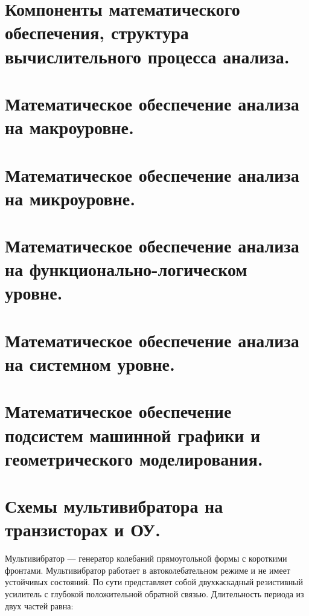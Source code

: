 \documentclass[unicode, 12pt, a4paper, oneside]{article}
\begin{document}
\section{Компоненты математического обеспечения, структура вычислительного процесса анализа.}
\section{Математическое обеспечение анализа на макроуровне.}
\section{Математическое обеспечение анализа на микроуровне.}
\section{Математическое обеспечение анализа на функционально-логическом уровне.}
\section{Математическое обеспечение анализа на системном уровне.}
\section{Математическое обеспечение подсистем машинной графики и геометрического моделирования.}

\section{Схемы мультивибратора на транзисторах и ОУ.}

Мультивибратор — генератор колебаний прямоугольной формы с короткими фронтами. Мультивибратор работает в автоколебательном режиме и не имеет устойчивых состояний. По сути представляет собой двухкаскадный резистивный усилитель с глубокой положительной обратной связью. Длительность периода из двух частей равна:
\end{document}
